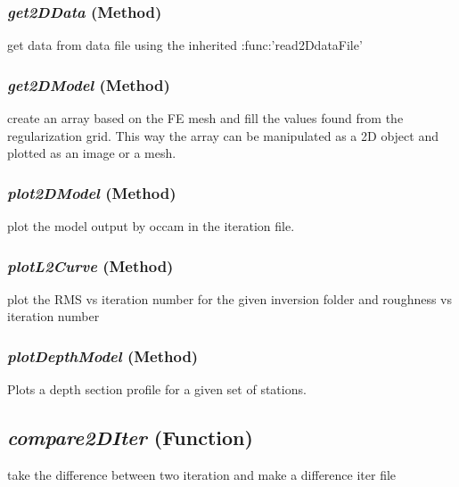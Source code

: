\subsubsection{\textit{get2DData} (Method)}
\label{sssec:.modeling.occamtools.Occam2DModel.get2DData}

get data from data file using the inherited :func:'read2DdataFile' 


\subsubsection{\textit{get2DModel} (Method)}
\label{sssec:.modeling.occamtools.Occam2DModel.get2DModel}

create an array based on the FE mesh and fill the 
        values found from the regularization grid.  This way the array can 
        be manipulated as a 2D object and plotted as an image or a mesh.
        
\subsubsection{\textit{plot2DModel} (Method)}
\label{sssec:.modeling.occamtools.Occam2DModel.plot2DModel}

plot the model output by occam in the iteration file.

\subsubsection{\textit{plotL2Curve} (Method)}
\label{sssec:.modeling.occamtools.Occam2DModel.plotL2Curve}

plot the RMS vs iteration number for the given 
        inversion folder and roughness vs iteration number

\subsubsection{\textit{plotDepthModel} (Method)}
\label{sssec:.modeling.occamtools.Occam2DModel.plotDepthModel}

Plots a depth section profile for a given set of stations.

\subsection{\textit{compare2DIter} (Function)}
\label{sssec:.modeling.occamtools.compare2DIter}


take the difference between two iteration and make a 
    difference iter file


